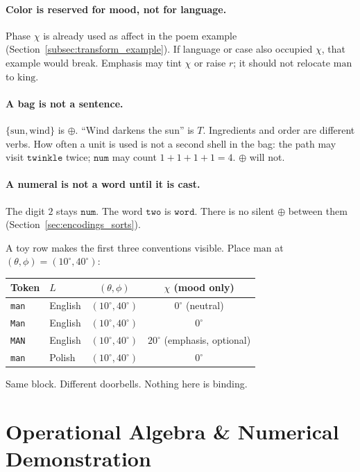 \documentclass[12pt, a4paper]{article}
\begin{document}
\paragraph{Color is reserved for mood, not for language.}
Phase $\chi$ is already used as affect in the poem example
(Section~\ref{subsec:transform_example}). If language or case also
occupied $\chi$, that example would break. Emphasis may tint $\chi$
or raise $r$; it should not relocate $\mathrm{man}$ to $\mathrm{king}$.

\paragraph{A bag is not a sentence.}
$\{\mathrm{sun},\mathrm{wind}\}$ is $\oplus$.
``Wind darkens the sun'' is $T$. Ingredients and order are different
verbs. How often a unit is used is not a second shell in the bag:
the path may visit $\texttt{twinkle}$ twice; $\mathtt{num}$ may
count $1+1+1+1=4$. $\oplus$ will not.

\paragraph{A numeral is not a word until it is cast.}
The digit $2$ stays $\mathtt{num}$. The word $\texttt{two}$ is
$\mathtt{word}$. There is no silent $\oplus$ between them
(Section~\ref{sec:encodings_sorts}).

A toy row makes the first three conventions visible. Place
$\mathrm{man}$ at $(\theta,\phi)=(10^\circ,40^\circ)$:

\begin{center}
\begin{tabular}{llcc}
Token & $L$ & $(\theta,\phi)$ & $\chi$ (mood only) \\
\hline
\texttt{man} & English & $(10^\circ,40^\circ)$ & $0^\circ$ (neutral) \\
\texttt{Man} & English & $(10^\circ,40^\circ)$ & $0^\circ$ \\
\texttt{MAN} & English & $(10^\circ,40^\circ)$ & $20^\circ$ (emphasis, optional) \\
\texttt{man} & Polish  & $(10^\circ,40^\circ)$ & $0^\circ$ \\
\end{tabular}
\end{center}

Same block. Different doorbells. Nothing here is binding.

\section{Operational Algebra \& Numerical Demonstration}
\end{document}
